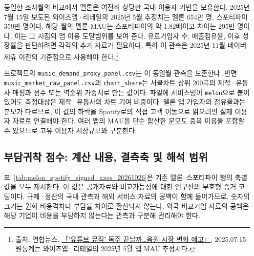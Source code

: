 \documentclass[11pt,a4paper]{report}
\newcommand{\sourcefootnote}[1]{\footnote{출처: #1}}
\begin{document}
동일한 조사월의 비교에서 멜론은 여전히 상당한 국내 이용자 기반을 보유한다. 2025년 7월 15일 보도된 와이즈앱·리테일의 2025년 5월 추정치는 멜론 654만 명, 스포티파이 359만 명이다. 해당 월의 멜론 MAU는 스포티파이의 약 1.82배이고 차이는 295만 명이다. 이는 그 시점의 앱 이용 도달범위를 보여 준다. 유료가입자 수, 매출점유율, 이후 성장률을 판단하려면 각각의 추가 자료가 필요하다. 특히 이 관측은 2025년 11월 네이버 제휴 이전의 기준점으로 사용해야 한다.\sourcefootnote{연합뉴스, \href{https://www.yna.co.kr/view/AKR20250715061200017}{「'유튜브 뮤직' 독주 끝날까…음원 시장 변화 예고」}, 2025.07.15. 원통계는 와이즈앱·리테일의 2025년 5월 앱 MAU 추정치다.}

프로젝트의 \nolinkurl{music_demand_proxy_panel.csv}는 이 동일월 관측을 보존한다. 반면 \nolinkurl{music_market_raw_panel.csv}의 \nolinkurl{chart_share}는 서클차트 상위 200곡의 제작·유통사 매핑과 점수 또는 역순위 가중치로 만든 값이다. 파일에 서비스명이 \texttt{melon}으로 붙어 있어도 측정대상은 제작·유통사의 차트 기여 비중이다. 멜론 앱 가입자의 점유율과는 분모가 다르므로, 이 값의 하락을 Spotify로의 직접 고객 이동으로 읽으려면 실제 이용자 자료로 연결해야 한다. 여러 앱의 MAU를 단순 합산한 분모도 중복 이용을 포함할 수 있으므로 고유 이용자 시장규모와 구분한다.

\subsection{부담귀착 점수: 계산 내용, 결측축 및 해석 범위}

표~\ref{tab:melon_spotify_signed_axes_20261026}은 기존 멜론--스포티파이 행의 축별 값을 모두 제시한다. 이 값은 공개자료와 비교가능성에 대한 연구진의 부호형 증거 코딩이다. 규제·정산의 국내 관측과 해외 서비스 자료의 공백이 함께 들어가므로, 숫자의 크기는 원화 비용격차나 부담률 차이로 환산되지 않는다. 외국 비교기업 자료의 공백은 해당 기업이 비용을 부담하지 않는다는 관측과 구분해 관리해야 한다.
\end{document}
